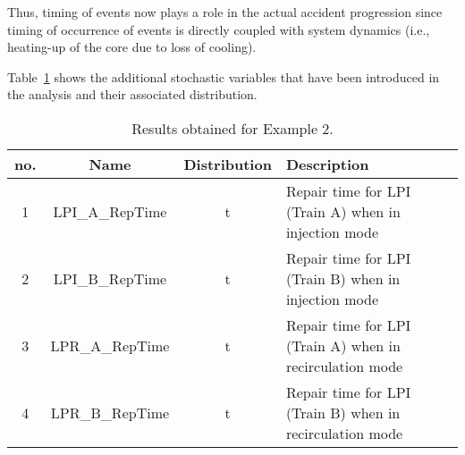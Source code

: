 Thus, timing of events now plays a role in the actual accident progression since timing of 
occurrence of events is directly coupled with system dynamics (i.e., heating-up of the core
due to loss of cooling).

Table~\ref{tab:case2NewVars} shows the additional stochastic variables that have been 
introduced in the analysis and their associated distribution.


\begin{table}
  \caption{Results obtained for Example 2.}
  \label{tab:case2NewVars}
  \centering
  \begin{tabular}{c | c | c | p{5cm}} 
   \hline 
     no. & Name            & Distribution  & Description \\ 
    \hline 
      1  & LPI\_A\_RepTime   &  t   &  Repair time for LPI (Train A) when in injection mode \\
      2  & LPI\_B\_RepTime   &  t   &  Repair time for LPI (Train B) when in injection mode \\
      3  & LPR\_A\_RepTime   &  t   &  Repair time for LPI (Train A) when in recirculation mode \\
      4  & LPR\_B\_RepTime   &  t   &  Repair time for LPI (Train B) when in recirculation mode \\
    \hline 
  \end{tabular}
\end{table}